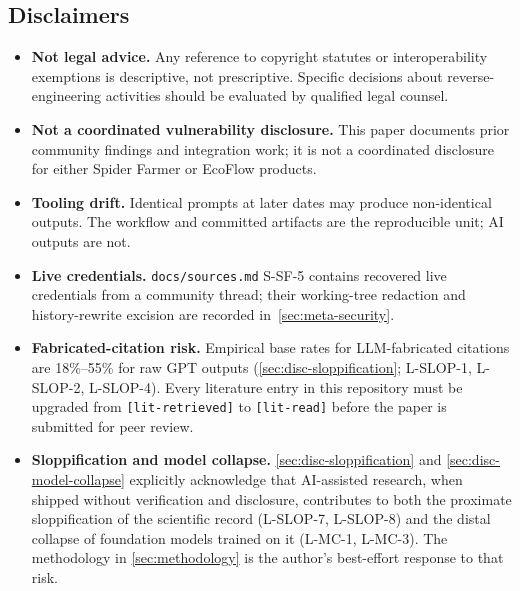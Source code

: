 \documentclass[11pt,a4paper]{article}
\begin{document}
\subsection{Disclaimers}
\label{sec:ai-disclosure-disclaimers}
\begin{itemize}
  \item \textbf{Not legal advice.} Any reference to copyright statutes
        or interoperability exemptions is descriptive, not prescriptive.
        Specific decisions about reverse-engineering activities should
        be evaluated by qualified legal counsel.
  \item \textbf{Not a coordinated vulnerability disclosure.} This paper
        documents prior community findings and integration work; it is
        not a coordinated disclosure for either Spider Farmer or
        EcoFlow products.
  \item \textbf{Tooling drift.} Identical prompts at later dates may
        produce non-identical outputs. The workflow and committed
        artifacts are the reproducible unit; AI outputs are not.
  \item \textbf{Live credentials.} \texttt{docs/sources.md} S-SF-5
        contains recovered live credentials from a community thread;
        their working-tree redaction and history-rewrite excision are
        recorded in~\cref{sec:meta-security}.
  \item \textbf{Fabricated-citation risk.} Empirical base rates for
        LLM-fabricated citations are 18\%--55\% for raw GPT outputs
        (\cref{sec:disc-sloppification}; L-SLOP-1, L-SLOP-2, L-SLOP-4).
        Every literature entry in this repository must be upgraded from
        \texttt{[lit-retrieved]} to \texttt{[lit-read]} before the
        paper is submitted for peer review.
  \item \textbf{Sloppification and model collapse.}
        \cref{sec:disc-sloppification} and
        \cref{sec:disc-model-collapse} explicitly acknowledge that
        AI-assisted research, when shipped without verification and
        disclosure, contributes to both the proximate sloppification
        of the scientific record (L-SLOP-7, L-SLOP-8) and the distal
        collapse of foundation models trained on it (L-MC-1, L-MC-3).
        The methodology in \cref{sec:methodology} is the author's
        best-effort response to that risk.
\end{itemize}
\end{document}
